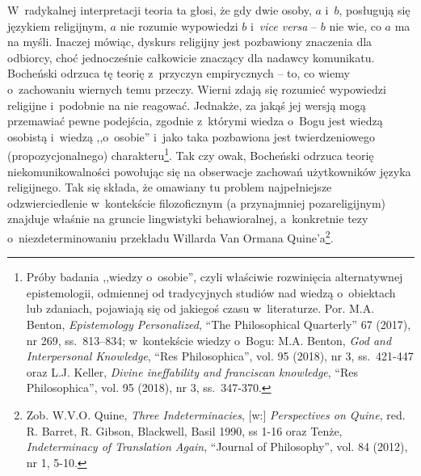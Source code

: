 W~radykalnej interpretacji teoria ta głosi, że gdy dwie osoby, $a$ i~$b$, posługują się językiem religijnym, $a$ nie rozumie wypowiedzi $b$ i~\textit{vice versa} -- $b$ nie wie, co $a$ ma na myśli. Inaczej mówiąc, dyskurs religijny jest pozbawiony znaczenia dla odbiorcy, choć jednocześnie całkowicie znaczący dla nadawcy komunikatu. Bocheński odrzuca tę teorię z~przyczyn empirycznych -- to, co wiemy o~zachowaniu wiernych temu przeczy. Wierni zdają się rozumieć wypowiedzi religijne i~podobnie na nie reagować. Jednakże, za jakąś jej wersją mogą przemawiać pewne podejścia, zgodnie z~którymi wiedza o~Bogu jest wiedzą osobistą i~wiedzą ,,o~osobie'' i~jako taka pozbawiona jest twierdzeniowego (propozycjonalnego) charakteru\footnote{Próby badania ,,wiedzy o~osobie'', czyli właściwie rozwinięcia alternatywnej epistemologii, odmiennej od tradycyjnych studiów nad wiedzą o~obiektach lub zdaniach, pojawiają się od jakiegoś czasu w~literaturze. Por. M.A. Benton, \textit{Epistemology Personalized}, ``The Philosophical Quarterly'' 67 (2017), nr 269, ss.~813–834; w~kontekście wiedzy o~Bogu: M.A. Benton, \textit{God and Interpersonal Knowledge}, ``Res Philosophica'', vol. 95 (2018), nr 3, ss.~421-447 oraz L.J. Keller, \textit{Divine ineffability and franciscan knowledge}, ``Res Philosophica'', vol. 95 (2018), nr 3, ss.~347-370.}. Tak czy owak, Bocheński odrzuca teorię niekomunikowalności powołując się na obserwacje zachowań użytkowników języka religijnego. Tak się składa, że omawiany tu problem najpełniejsze odzwierciedlenie w~kontekście filozoficznym (a przynajmniej pozareligijnym) znajduje właśnie na gruncie lingwistyki behawioralnej, a~konkretnie tezy o~niezdeterminowaniu przekładu Willarda Van Ormana Quine'a\footnote{Zob. W.V.O. Quine, \textit{Three Indeterminacies}, [w:] \textit{Perspectives on Quine}, red. R. Barret, R. Gibson, Blackwell, Basil 1990, ss 1-16 oraz Tenże, \textit{Indeterminacy of Translation Again}, ``Journal of Philosophy'', vol. 84 (2012), nr 1, 5-10.}.

